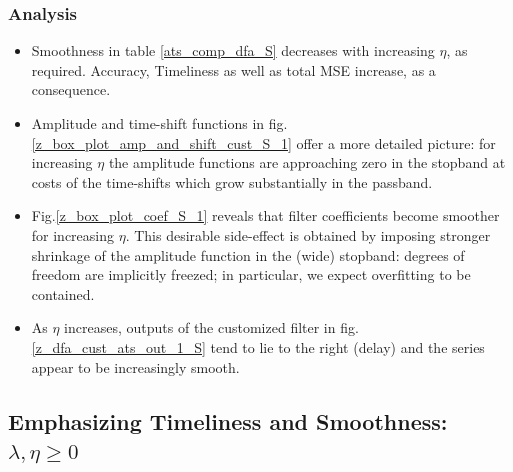 \documentclass[a4paper]{book}
\begin{document}
\subsubsection{Analysis}
\begin{itemize}
\item Smoothness in table \ref{ats_comp_dfa_S} decreases with increasing $\eta$, as required. Accuracy, Timeliness as well as total MSE increase, as a consequence.
\item Amplitude and time-shift functions in fig.\ref{z_box_plot_amp_and_shift_cust_S_1} offer a more detailed picture: for increasing $\eta$ the amplitude functions are approaching zero in the stopband at costs of the time-shifts which grow substantially in the passband. 
\item Fig.\ref{z_box_plot_coef_S_1} reveals that filter coefficients become smoother for increasing $\eta$. This desirable side-effect is obtained by imposing stronger shrinkage of the amplitude function in the (wide) stopband: degrees of freedom are implicitly freezed; in particular, we expect overfitting to be contained. 
\item As $\eta$ increases, outputs of the customized filter in fig.\ref{z_dfa_cust_ats_out_1_S} tend to lie to the right (delay) and the series appear to be increasingly smooth.
\end{itemize}



\subsection{Emphasizing Timeliness and Smoothness: $\lambda,\eta\geq0$}\label{l_e_geq_0}
\end{document}
